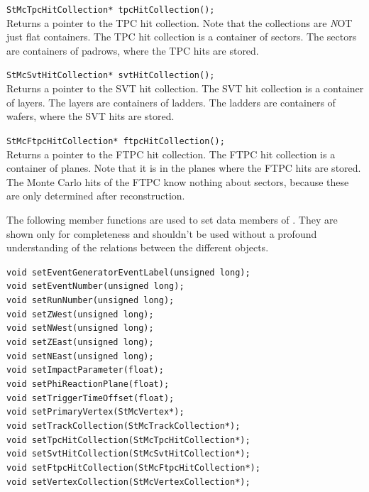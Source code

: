 \begin{Entry}
    \verb+StMcTpcHitCollection* tpcHitCollection();+\\ 
    Returns a pointer to the TPC hit collection.  Note that the
    collections are {\emph NOT} just flat containers.  The TPC hit
    collection is a container of sectors.  The sectors are containers
    of padrows, where the TPC hits are stored.

    \verb+StMcSvtHitCollection* svtHitCollection();+\\
    Returns a pointer to the SVT hit collection.  The SVT hit
    collection is a container of layers.  The layers are containers
    of ladders.  The ladders are containers of wafers,
    where the SVT hits are stored.


    \verb+StMcFtpcHitCollection* ftpcHitCollection();+\\
    Returns a pointer to the FTPC hit collection. The FTPC hit
    collection is a container of planes.  Note that it is in the planes 
    where the FTPC hits are stored.  The Monte Carlo hits of the FTPC
    know nothing about sectors, because these are only determined
    after reconstruction.


    The following member functions are used to set data members of .
    They are shown only for completeness and shouldn't be used without
    a profound understanding of the relations between the different objects.

    \verb+void setEventGeneratorEventLabel(unsigned long);+\\
    \verb+void setEventNumber(unsigned long);+\\
    \verb+void setRunNumber(unsigned long);+\\
    \verb+void setZWest(unsigned long);+\\
    \verb+void setNWest(unsigned long);+\\
    \verb+void setZEast(unsigned long);+\\
    \verb+void setNEast(unsigned long);+\\
    \verb+void setImpactParameter(float);+\\
    \verb+void setPhiReactionPlane(float);+\\
    \verb+void setTriggerTimeOffset(float);+\\
    \verb+void setPrimaryVertex(StMcVertex*);+\\
    \verb+void setTrackCollection(StMcTrackCollection*);+\\
    \verb+void setTpcHitCollection(StMcTpcHitCollection*);+\\
    \verb+void setSvtHitCollection(StMcSvtHitCollection*);+\\
    \verb+void setFtpcHitCollection(StMcFtpcHitCollection*);+\\
    \verb+void setVertexCollection(StMcVertexCollection*);+\\


\end{Entry}
